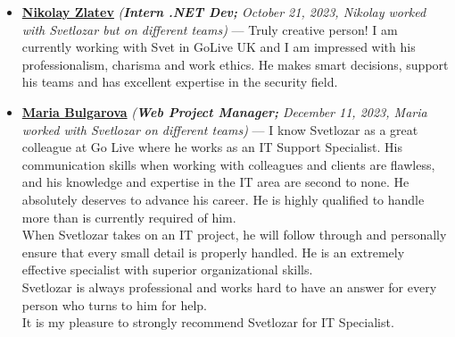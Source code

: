 \documentclass[letterpaper, 10pt]{article}
\begin{document}
\begin{itemize}
	\item \textbf{\href{https://www.linkedin.com/in/nikolay-zlatev/}{Nikolay
			Zlatev}} \textit{(\textbf{Intern .NET Dev;} October 21, 2023, Nikolay worked with Svetlozar but on different teams)} — Truly creative person! I am currently working with Svet in GoLive
	UK and I am impressed with his professionalism, charisma and work ethics. He
	makes smart decisions, support his teams and has excellent expertise in
	the security field.
	
	\item \textbf{\href{https://www.linkedin.com/in/maria-bulgarova-15476b32/}{Maria
			Bulgarova}} \textit{(\textbf{Web Project Manager;} December 11, 2023, Maria  worked with Svetlozar on different teams)} — I know Svetlozar as a great colleague at Go Live where he works as an IT Support Specialist. His communication skills when working with colleagues and clients are flawless, and his knowledge and expertise in the IT area are second to none. He absolutely deserves to advance his career. He is highly qualified to handle more than is currently required of him.\\
	When Svetlozar takes on an IT project, he will follow through and personally ensure that every small detail is properly handled. He is an extremely effective specialist with superior organizational skills.\\
	Svetlozar is always professional and works hard to have an answer for every person who turns to him for help.\\
	It is my pleasure to strongly recommend Svetlozar for IT Specialist.
\end{itemize}
\end{document}
